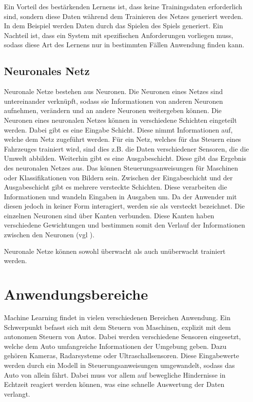 Ein Vorteil des bestärkenden Lernens ist, dass keine Trainingsdaten erforderlich sind, sondern diese Daten während dem Trainieren des Netzes generiert werden. In dem Beispiel werden Daten durch das Spielen des Spiels generiert. Ein Nachteil ist, dass ein System mit spezifischen Anforderungen vorliegen muss, sodass diese Art des Lernens nur in bestimmten Fällen Anwendung finden kann.

\subsection{Neuronales Netz}
\label{neuronalesNetz}
Neuronale Netze bestehen aus Neuronen. Die Neuronen eines Netzes sind untereinander verknüpft, sodass sie Informationen von anderen Neuronen aufnehmen, verändern und an andere Neuronen weitergeben können. Die Neuronen eines neuronalen Netzes können in verschiedene Schichten eingeteilt werden. Dabei gibt es eine Eingabe Schicht. Diese nimmt Informationen auf, welche dem Netz zugeführt werden. Für ein Netz, welches für das Steuern eines Fahrzeuges trainiert wird, sind dies z.B. die Daten verschiedener Sensoren, die die Umwelt abbilden. Weiterhin gibt es eine Ausgabeschicht. Diese gibt das Ergebnis des neuronalen Netzes aus. Das können Steuerungsanweisungen für Maschinen oder Klassifikationen von Bildern sein. Zwischen der Eingabeschicht und der Ausgabeschicht gibt es mehrere versteckte Schichten. Diese verarbeiten die Informationen und wandeln Eingaben in Ausgaben um. Da der Anwender mit diesen jedoch in keiner Form interagiert, werden sie als versteckt bezeichnet. Die einzelnen Neuronen sind über Kanten verbunden. Diese Kanten haben verschiedene Gewichtungen und bestimmen somit den Verlauf der Informationen zwischen den Neuronen (vgl \cite[]{neuronalesNetz}).

Neuronale Netze können sowohl überwacht als auch unüberwacht trainiert werden.

\section{Anwendungsbereiche}
\label{sec:anwendungsbereiche}
Machine Learning findet in vielen verschiedenen Bereichen Anwendung. Ein Schwerpunkt befasst sich mit dem Steuern von Maschinen, explizit mit dem autonomen Steuern von Autos. Dabei werden verschiedene Sensoren eingesetzt, welche dem Auto umfangreiche Informationen der Umgebung geben. Dazu gehören Kameras, Radarsysteme oder Ultraschallsensoren. Diese Eingabewerte werden durch ein Modell in Steuerungsanweisungen umgewandelt, sodass das Auto von allein fährt. Dabei muss vor allem auf bewegliche Hindernisse in Echtzeit reagiert werden können, was eine schnelle Auswertung der Daten verlangt.

